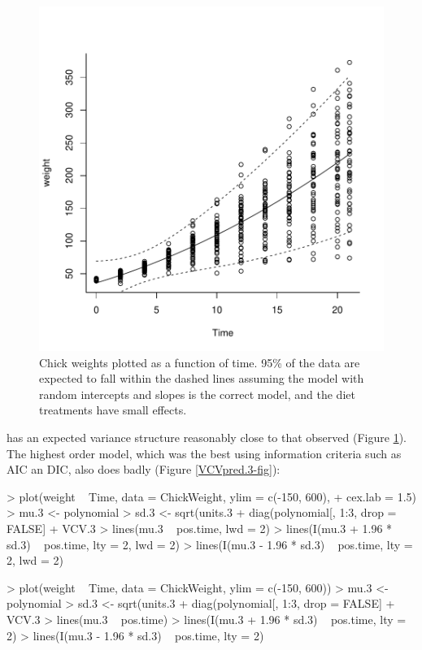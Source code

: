 \documentclass{article}
\begin{document}
\begin{figure}[!h]
\begin{center}
\includegraphics{Lecture4-037}
\end{center}
\caption{Chick weights plotted as a function of time. 95\% of the data are expected to fall within the dashed lines assuming the model with random intercepts and slopes is the correct model, and the diet treatments have small effects.}
\label{VCVpred.2-fig}
\end{figure}

has an expected variance structure reasonably close to that observed (Figure \ref{VCVpred.2-fig}). The highest order model, which was the best using information criteria such as AIC an DIC, also does badly (Figure \ref{VCVpred.3-fig}): 

\iftalk
\begin{Schunk}
\begin{Sinput}
> plot(weight ~ Time, data = ChickWeight, ylim = c(-150, 600), 
+     cex.lab = 1.5)
> mu.3 <- polynomial %
> sd.3 <- sqrt(units.3 + diag(polynomial[, 1:3, drop = FALSE] %
+     VCV.3 %
> lines(mu.3 ~ pos.time, lwd = 2)
> lines(I(mu.3 + 1.96 * sd.3) ~ pos.time, lty = 2, lwd = 2)
> lines(I(mu.3 - 1.96 * sd.3) ~ pos.time, lty = 2, lwd = 2)
\end{Sinput}
\end{Schunk}
\else
\begin{Schunk}
\begin{Sinput}
> plot(weight ~ Time, data = ChickWeight, ylim = c(-150, 600))
> mu.3 <- polynomial %
> sd.3 <- sqrt(units.3 + diag(polynomial[, 1:3, drop = FALSE] %
+     VCV.3 %
> lines(mu.3 ~ pos.time)
> lines(I(mu.3 + 1.96 * sd.3) ~ pos.time, lty = 2)
> lines(I(mu.3 - 1.96 * sd.3) ~ pos.time, lty = 2)
\end{Sinput}
\end{Schunk}
\fi
\end{document}
